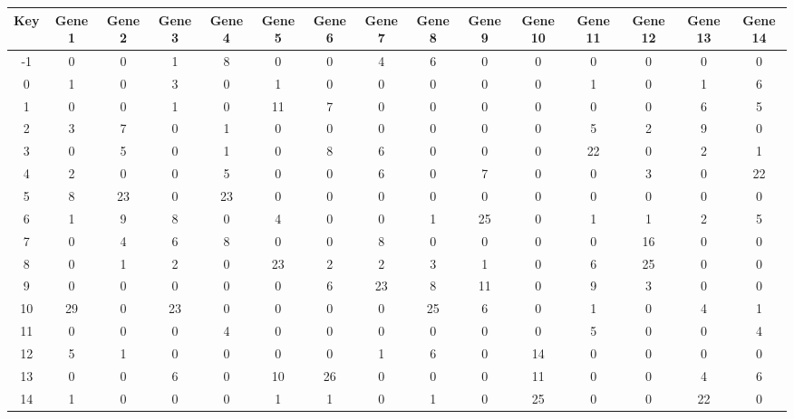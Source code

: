 \begin{tabular}{|c|c|c|c|c|c|c|c|c|c|c|c|c|c|c|}
\hline
Key & Gene 1 & Gene 2 & Gene 3 & Gene 4 & Gene 5 & Gene 6 & Gene 7 & Gene 8 & Gene 9 & Gene 10 & Gene 11 & Gene 12 & Gene 13 & Gene 14 \\
\hline
-1 & 0 & 0 & 1 & 8 & 0 & 0 & 4 & 6 & 0 & 0 & 0 & 0 & 0 & 0 \\
0 & 1 & 0 & 3 & 0 & 1 & 0 & 0 & 0 & 0 & 0 & 1 & 0 & 1 & 6 \\
1 & 0 & 0 & 1 & 0 & 11 & 7 & 0 & 0 & 0 & 0 & 0 & 0 & 6 & 5 \\
2 & 3 & 7 & 0 & 1 & 0 & 0 & 0 & 0 & 0 & 0 & 5 & 2 & 9 & 0 \\
3 & 0 & 5 & 0 & 1 & 0 & 8 & 6 & 0 & 0 & 0 & 22 & 0 & 2 & 1 \\
4 & 2 & 0 & 0 & 5 & 0 & 0 & 6 & 0 & 7 & 0 & 0 & 3 & 0 & 22 \\
5 & 8 & 23 & 0 & 23 & 0 & 0 & 0 & 0 & 0 & 0 & 0 & 0 & 0 & 0 \\
6 & 1 & 9 & 8 & 0 & 4 & 0 & 0 & 1 & 25 & 0 & 1 & 1 & 2 & 5 \\
7 & 0 & 4 & 6 & 8 & 0 & 0 & 8 & 0 & 0 & 0 & 0 & 16 & 0 & 0 \\
8 & 0 & 1 & 2 & 0 & 23 & 2 & 2 & 3 & 1 & 0 & 6 & 25 & 0 & 0 \\
9 & 0 & 0 & 0 & 0 & 0 & 6 & 23 & 8 & 11 & 0 & 9 & 3 & 0 & 0 \\
10 & 29 & 0 & 23 & 0 & 0 & 0 & 0 & 25 & 6 & 0 & 1 & 0 & 4 & 1 \\
11 & 0 & 0 & 0 & 4 & 0 & 0 & 0 & 0 & 0 & 0 & 5 & 0 & 0 & 4 \\
12 & 5 & 1 & 0 & 0 & 0 & 0 & 1 & 6 & 0 & 14 & 0 & 0 & 0 & 0 \\
13 & 0 & 0 & 6 & 0 & 10 & 26 & 0 & 0 & 0 & 11 & 0 & 0 & 4 & 6 \\
14 & 1 & 0 & 0 & 0 & 1 & 1 & 0 & 1 & 0 & 25 & 0 & 0 & 22 & 0 \\
\hline
\end{tabular}
